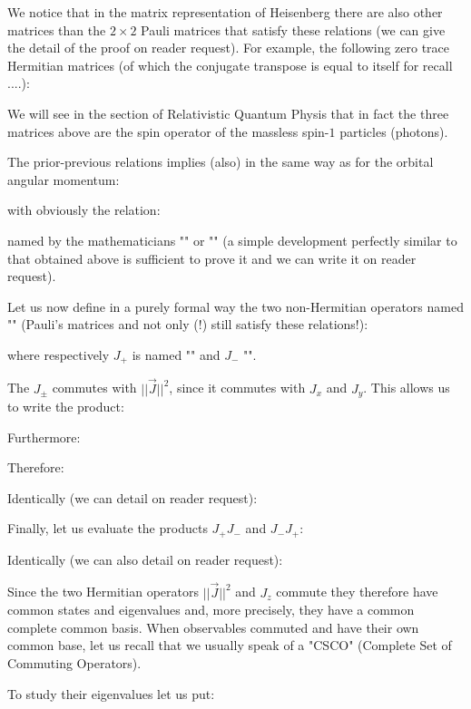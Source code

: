 	We notice that in the matrix representation of Heisenberg there are also other matrices than the $2\times 2$ Pauli matrices that satisfy these relations (we can give the detail of the proof on reader request). For example, the following zero trace Hermitian matrices (of which the conjugate transpose is equal to itself for recall ....):
	
	\begin{tcolorbox}[title=Remark,colframe=black,arc=10pt]
	We will see in the section of Relativistic Quantum Physis that in fact the three matrices above are the spin operator of the massless spin-$1$ particles (photons).
	\end{tcolorbox}
	The prior-previous relations implies (also) in the same way as for the orbital angular momentum:
	
	with obviously the relation:
	
	named by the mathematicians "" or "" (a simple development perfectly similar to that obtained above is sufficient to prove it and we can write it on reader request).
	
	Let us now define in a purely formal way the two non-Hermitian operators named "" (Pauli's matrices and not only (!) still satisfy these relations!):
	
	where respectively $J_+$ is named "" and $J_-$ "".

	The $J_{\pm}$ commutes with $||\vec{J}||^2$, since it commutes with $J_x$ and $J_y$. This allows us to write the product:
	
	Furthermore:
	
	Therefore:
	
	Identically (we can detail on reader request):
	
	Finally, let us evaluate the products $J_+J_-$ and $J_-J_+$:
	
	Identically (we can also detail on reader request):
	
	Since the two Hermitian operators $||\vec{J}||^2$ and $J_z$ commute they therefore have common states and eigenvalues and, more precisely, they have a common complete common basis. When observables commuted and have their own common base, let us recall that we usually speak of a "CSCO" (Complete Set of Commuting Operators).
	
	To study their eigenvalues let us put:
	
